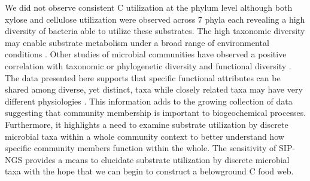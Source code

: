 We did not observe consistent C utilization at the phylum level although both xylose and cellulose utilization were observed across 7 phyla each revealing a high diversity of bacteria able to utilize these substrates. The high taxonomic diversity may enable substrate metabolism under a broad range of environmental conditions \cite{Goldfarb_2011}. Other studies of microbial communities have observed a positive correlation with taxonomic or phylogenetic diversity and functional diversity \cite{Fierer_2012,Fierer_2013,Philippot_2010,Tringe_2005,Gilbert_2010,Bryant_2012}. The data presented here supports that specific functional attributes can be shared among diverse, yet distinct, taxa while closely related taxa may have very different physiologies \cite{Fierer_2012,Philippot_2010}. This information adds to the growing collection of data suggesting that community membership is important to biogeochemical processes. Furthermore, it highlights a need to examine substrate utilization by discrete microbial taxa within a whole community context to better understand how specific community members function within the whole. The sensitivity of SIP-NGS provides a means to elucidate substrate utilization by discrete microbial taxa with the hope that we can begin to construct a belowground C food web.          
